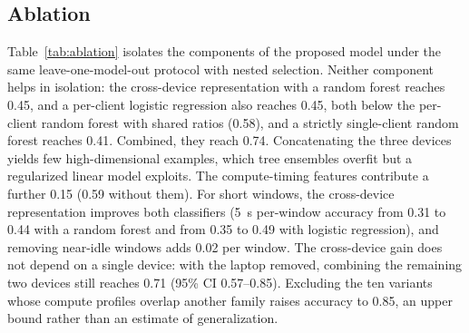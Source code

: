 \documentclass[conference]{IEEEtran}
\begin{document}
\subsection{Ablation}
\label{subsec:ablation}
Table~\ref{tab:ablation} isolates the components of the proposed model under the
same leave-one-model-out protocol with nested selection. Neither component helps
in isolation: the cross-device representation with a random forest reaches 0.45,
and a per-client logistic regression also reaches 0.45, both below the per-client
random forest with shared ratios (0.58), and a strictly single-client random
forest reaches 0.41. Combined, they reach 0.74. Concatenating the three devices
yields few high-dimensional examples, which tree ensembles overfit but a
regularized linear model exploits. The compute-timing features contribute a
further 0.15 (0.59 without them). For short windows, the cross-device
representation improves both classifiers (5~s per-window accuracy from 0.31 to
0.44 with a random forest and from 0.35 to 0.49 with logistic regression), and
removing near-idle windows adds 0.02 per window. The cross-device gain does not
depend on a single device: with the laptop removed, combining the remaining two
devices still reaches 0.71 (95\% CI 0.57--0.85). Excluding the ten variants
whose compute profiles overlap another family raises accuracy to 0.85, an upper
bound rather than an estimate of generalization.
\end{document}
